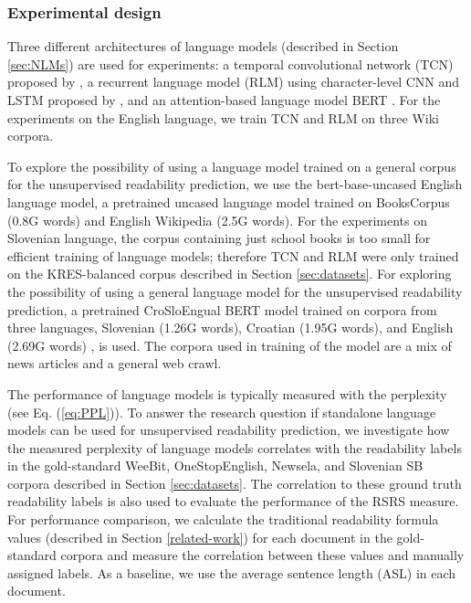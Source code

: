 \documentclass{clv3}
\begin{document}
\subsubsection{Experimental design}
Three different architectures of language models (described in Section \ref{sec:NLMs}) are used for experiments: a temporal convolutional network (TCN) proposed by  \citet{bai2018empirical}, a recurrent language model (RLM) using character-level CNN and LSTM proposed by \citet{kim2016character}, and an attention-based language model BERT \citep{devlin2018bert}. For the experiments on the English language, we train TCN and RLM on three Wiki corpora.

To explore the possibility of using a language model trained on a general corpus for the unsupervised readability prediction, we use the bert-base-uncased English language model, a pretrained uncased language model trained on BooksCorpus (0.8G words) \citep{zhu2015aligning} and English Wikipedia (2.5G words). For the experiments on Slovenian language, the corpus containing just school books is too small for efficient training of language models; therefore TCN and RLM were only trained on the KRES-balanced corpus described in Section \ref{sec:datasets}. For exploring the possibility of using a general language model for the unsupervised readability prediction, a pretrained CroSloEngual BERT model trained on corpora from three languages, Slovenian (1.26G words), Croatian (1.95G words), and English (2.69G words) \citep{ulcar2020xlbert}, is used. The corpora used in training of the model are a mix of news articles and a general web crawl.  

The performance of language models is typically measured with the perplexity (see Eq. (\ref{eq:PPL})). To answer the research question if standalone language models can be used for unsupervised readability prediction, we investigate how the measured perplexity of language models correlates with the readability labels in the gold-standard WeeBit, OneStopEnglish, Newsela, and Slovenian SB corpora described in Section \ref{sec:datasets}. The correlation to these ground truth readability labels is also used to evaluate the performance of the RSRS measure. For performance comparison, we calculate the traditional readability formula values (described in Section \ref{related-work}) for each document in the gold-standard corpora and measure the correlation between these values and manually assigned labels. As a baseline, we use the average sentence length (ASL) in each document.
\end{document}
